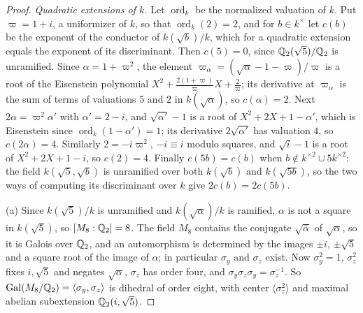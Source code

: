 \begin{proof}
\emph{Quadratic extensions of $k$.} Let $\operatorname{ord}_k$ be the
normalized valuation of $k$. Put $\varpi=1+i$, a uniformizer of $k$,
so that $\operatorname{ord}_k(2)=2$, and for $b\in k^\times$ let $c(b)$ be the exponent of the
conductor of $k(\sqrt b)/k$, which for a quadratic extension equals the
exponent of its discriminant. Then $c(5)=0$, since $\mathbb Q_2(\sqrt5)/\mathbb Q_2$ is
unramified. Since $\alpha=1+\varpi^2$, the element
$\varpi_\alpha=(\sqrt\alpha-1-\varpi)/\varpi$ is a root of the Eisenstein
polynomial $X^2+\frac{2(1+\varpi)}\varpi X+\frac2\varpi$; its derivative at
$\varpi_\alpha$ is the sum of terms of valuations $5$ and $2$ in
$k(\sqrt\alpha)$, so $c(\alpha)=2$. Next $2\alpha=\varpi^2\alpha'$ with
$\alpha'=2-i$, and $\sqrt{\alpha'}-1$ is a root of $X^2+2X+1-\alpha'$, which
is Eisenstein since $\operatorname{ord}_k(1-\alpha')=1$; its derivative $2\sqrt{\alpha'}$ has
valuation $4$, so $c(2\alpha)=4$. Similarly $2=-i\varpi^2$, $-i\equiv i$
modulo squares, and $\sqrt i-1$ is a root of $X^2+2X+1-i$, so $c(2)=4$.
Finally $c(5b)=c(b)$ when $b\notin k^{\times2}\cup5k^{\times2}$: the field
$k(\sqrt5,\sqrt b)$ is unramified over both $k(\sqrt b)$ and $k(\sqrt{5b})$,
so the two ways of computing its discriminant over $k$ give $2c(b)=2c(5b)$.

(a) Since $k(\sqrt5)/k$ is unramified and $k(\sqrt\alpha)/k$ is ramified,
$\alpha$ is not a square in $k(\sqrt5)$, so $[M_8:\mathbb Q_2]=8$. The field $M_8$
contains the conjugate $\sqrt{\bar\alpha}$ of $\sqrt\alpha$, so it is Galois
over $\mathbb Q_2$, and an automorphism is determined by the images $\pm i$,
$\pm\sqrt5$ and a square root of the image of $\alpha$; in particular
$\sigma_y$ and $\sigma_z$ exist. Now $\sigma_y^2=1$, $\sigma_z^2$ fixes
$i,\sqrt5$ and negates $\sqrt\alpha$, $\sigma_z$ has order four, and
$\sigma_y\sigma_z\sigma_y=\sigma_z^{-1}$. So
$\operatorname{Gal}(M_8/\mathbb Q_2)=\langle\sigma_y,\sigma_z\rangle$ is dihedral of order eight,
with center $\langle\sigma_z^2\rangle$ and maximal abelian subextension
$\mathbb Q_2(i,\sqrt5)$.


\end{proof}
